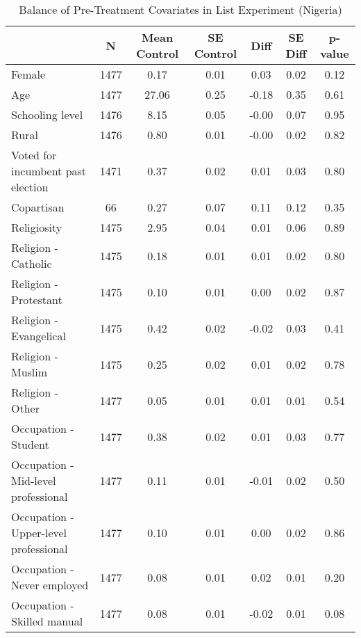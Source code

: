 \begin{table}[htb]
\footnotesize \centering
\caption{Balance of Pre-Treatment Covariates in List Experiment (Nigeria)} 
\label{tab:bal_ng}
\begin{tabular}{lcccccc}
  \hline
 & N & Mean Control & SE Control & Diff & SE Diff & p-value \\ 
  \hline
Female & 1477 & 0.17 & 0.01 & 0.03 & 0.02 & 0.12 \\ 
  Age & 1477 & 27.06 & 0.25 & -0.18 & 0.35 & 0.61 \\ 
  Schooling level & 1476 & 8.15 & 0.05 & -0.00 & 0.07 & 0.95 \\ 
  Rural & 1476 & 0.80 & 0.01 & -0.00 & 0.02 & 0.82 \\ 
  Voted for incumbent past election & 1471 & 0.37 & 0.02 & 0.01 & 0.03 & 0.80 \\ 
  Copartisan & 66 & 0.27 & 0.07 & 0.11 & 0.12 & 0.35 \\ 
  Religiosity & 1475 & 2.95 & 0.04 & 0.01 & 0.06 & 0.89 \\ 
  Religion - Catholic & 1475 & 0.18 & 0.01 & 0.01 & 0.02 & 0.80 \\ 
  Religion - Protestant & 1475 & 0.10 & 0.01 & 0.00 & 0.02 & 0.87 \\ 
  Religion - Evangelical & 1475 & 0.42 & 0.02 & -0.02 & 0.03 & 0.41 \\ 
  Religion - Muslim & 1475 & 0.25 & 0.02 & 0.01 & 0.02 & 0.78 \\ 
  Religion - Other & 1477 & 0.05 & 0.01 & 0.01 & 0.01 & 0.54 \\ 
  Occupation - Student & 1477 & 0.38 & 0.02 & 0.01 & 0.03 & 0.77 \\ 
  Occupation - Mid-level professional & 1477 & 0.11 & 0.01 & -0.01 & 0.02 & 0.50 \\ 
  Occupation - Upper-level professional & 1477 & 0.10 & 0.01 & 0.00 & 0.02 & 0.86 \\ 
  Occupation - Never employed & 1477 & 0.08 & 0.01 & 0.02 & 0.01 & 0.20 \\ 
  Occupation - Skilled manual & 1477 & 0.08 & 0.01 & -0.02 & 0.01 & 0.08 \\ 
   \hline
\end{tabular}

\end{table}
